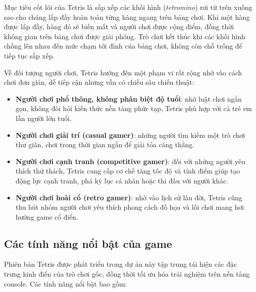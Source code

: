 Mục tiêu cốt lõi của Tetris là sắp xếp các khối hình (\textit{tetromino}) rơi từ trên xuống sao cho chúng lấp đầy hoàn toàn từng hàng ngang trên bảng chơi. Khi một hàng được lấp đầy, hàng đó sẽ biến mất và người chơi được cộng điểm, đồng thời không gian trên bảng chơi được giải phóng. Trò chơi kết thúc khi các khối hình chồng lên nhau đến mức chạm tới đỉnh của bảng chơi, không còn chỗ trống để tiếp tục sắp xếp.

Về đối tượng người chơi, Tetris hướng đến một phạm vi rất rộng nhờ vào cách chơi đơn giản, dễ tiếp cận nhưng vẫn có chiều sâu chiến thuật:
\begin{itemize}
    \item \textbf{Người chơi phổ thông, không phân biệt độ tuổi}: nhờ luật chơi ngắn gọn, không đòi hỏi kiến thức nền tảng phức tạp, Tetris phù hợp với cả trẻ em lẫn người lớn tuổi.
    \item \textbf{Người chơi giải trí (casual gamer)}: những người tìm kiếm một trò chơi thư giãn, chơi trong thời gian ngắn để giải tỏa căng thẳng.
    \item \textbf{Người chơi cạnh tranh (competitive gamer)}: đối với những người yêu thích thử thách, Tetris cung cấp cơ chế tăng tốc độ và tính điểm giúp tạo động lực cạnh tranh, phá kỷ lục cá nhân hoặc thi đấu với người khác.
    \item \textbf{Người chơi hoài cổ (retro gamer)}: nhờ vào lịch sử lâu đời, Tetris cũng thu hút nhóm người chơi yêu thích phong cách đồ họa và lối chơi mang hơi hướng game cổ điển.
\end{itemize}

\subsection{Các tính năng nổi bật của game}

Phiên bản Tetris được phát triển trong dự án này tập trung tái hiện các đặc trưng kinh điển của trò chơi gốc, đồng thời tối ưu hóa trải nghiệm trên nền tảng console. Các tính năng nổi bật bao gồm:

